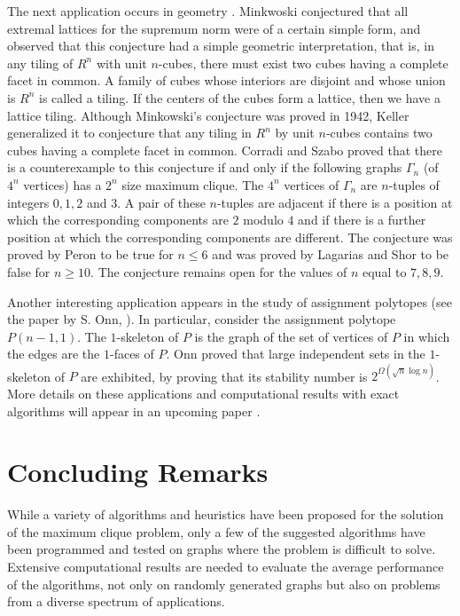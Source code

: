 The next application occurs in geometry \cite{Ste74}. Minkwoski
conjectured that all extremal lattices for the supremum norm were of
a certain simple form, and observed that this conjecture had a
simple geometric interpretation, that is, in any tiling of $R^n$
with unit $n$-cubes, there must exist two cubes having a complete
facet in common. A family of cubes whose interiors are disjoint and
whose union is $R^n$ is called a tiling. If the centers of the cubes
form a lattice, then we have a lattice tiling. Although Minkowski's
conjecture was proved in 1942, Keller generalized it to conjecture
that any tiling in $R^n$ by unit $n$-cubes contains two cubes having
a complete facet in common. Corradi and Szabo \cite{CoSz90} proved
that there is a counterexample to this conjecture if and only if the
following graphs $\Gamma_n$ (of $4^{n}$ vertices) has a $2^n$ size
maximum clique. The $4^n$ vertices of $\Gamma_n$ are $n$-tuples of
integers $0,1,2$ and $3$. A pair of these $n$-tuples are adjacent if
there is a position at which the corresponding components are $2$
modulo $4$ and if there is a further position at which the
corresponding components are different. The conjecture was proved by
Peron \cite{Per40} to be true for $n \leq 6$ and was proved by
Lagarias and Shor \cite{LaSh92} to be false for $n \geq 10$. The
conjecture remains open for the values of $n$ equal to $7,8,9$.

Another interesting application appears in the study of assignment
polytopes (see the paper by S. Onn, \cite{Onn92}). In particular,
consider the assignment polytope $P(n-1,1)$. The $1$-skeleton of $P$
is the graph of the set of vertices of $P$ in which the edges are
the $1$-faces of $P$. Onn proved that large independent sets in the
$1$-skeleton of $P$ are exhibited, by proving that its stability
number is $2^{\Omega (\sqrt{n} \log n)}$.
More details on these applications and computational results with
exact algorithms will appear in an upcoming paper \cite{HPV92}.

\section{Concluding Remarks}

While a variety of algorithms and heuristics have been proposed for 
the solution of the maximum clique problem, only a few of the
suggested algorithms have been programmed and tested on graphs where
the problem is difficult to solve. Extensive computational results 
are needed to evaluate the average performance of the algorithms,
not only on randomly generated graphs but also on problems from a 
diverse spectrum of applications.

